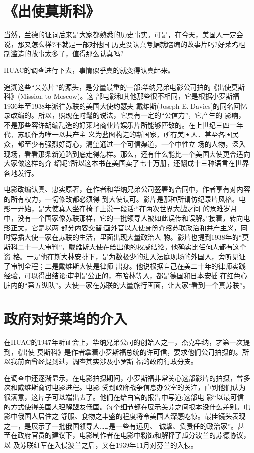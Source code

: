 \documentclass[10pt]{article}
\begin{document}
{\pagebreak
\section{《出使莫斯科》}

当然，兰德的证词后来是大家都熟悉的历史事实。可是，在今天，美国人一定会说，那又怎么样?不就是一部对他国
历史没认真考据就瞎编的故事片吗?好莱坞粗制滥造的故事太多了，值得那么认真吗?

HUAC的调查进行下去，事情似乎真的就变得认真起来。

追溯这些``亲苏片''的源头，是分量最重的一部:华纳兄弟电影公司拍的《出使莫斯科》(Mission to Moscow)。这
部电影和其他那些很不相同，它是根据小罗斯福1936年至1938年派往苏联的美国大使约瑟夫\textperiodcentered
戴维斯(Joseph E. Davies)的同名回忆录改编的。所以，照现在时髦的说法，它具有一定的``公信力''，它产生的
影响，不是那些容许胡编乱造的好莱坞商业片娱乐片所能够匹敌的。在上世纪三四十年代，苏联作为唯一以共产主
义为蓝图构造的新国家，所有美国人、甚至各国民众，都至少有强烈好奇心，渴望通过一个可信渠道，一个中性立
场的人物，深入现场，看看那条新道路到底走得怎样。那么，还有什么能比一个美国大使更合适向大家做这样的介
绍呢?所以这本书在美国卖了七十万册，还翻成十三种语言在世界各地发行。

电影改编认真、忠实原著，在作者和华纳兄弟公司签署的合同中，作者享有对内容的所有权力，一切修改都必须得
到大使认可。影片是那种所谓仿纪录片风格。电影一开始，是大使真人坐在椅子上说一段话:``在两次世界大战之间
的危难岁月中，没有一个国家像苏联那样，它的一批领导人被如此误传和误解。''接着，转向电影正文，它是以两
部分内容交替:画外音以大使身份介绍苏联政治和共产主义，同时穿插大使一家在苏联的生活，里面出现大量政治人
物。影片也提到1938年的``莫斯科二十一人审判''，戴维斯大使在给出他的权威结论，他确实比任何人都有这个资
格。一是他在斯大林安排下，是为数极少的进入法庭现场的外国人，旁听见证了审判全程；二是戴维斯大使是律师
出身。他说根据自己在美二十年的律师实践经验，可以得出结论:审判是公正的，布哈林等人，都是德国和日本安插
在红色心脏内的``第五纵队''。大使一家在苏联的大量旅行画面，让大家``看到一个真苏联''。

\pagebreak
\section{政府对好莱坞的介入}

在HUAC的1947年听证会上，华纳兄弟公司的创始人之一，杰克\textperiodcentered 华纳，才第一次提到，《出使
莫斯科》是作者拿着小罗斯福总统的许可信，要求他们公司拍摄的。所以我前面曾经提到过，调查其实涉及小罗斯
福的政府行政分支。

在调查中还逐渐显示，在电影拍摄期间，小罗斯福非常关心这部影片的拍摄，曾多次和戴维斯商讨电影进程。电影
受到政府战争信息办公室的关注，直到他们认为很满意，这片子可以端出去了。他们在给白宫的报告中写道:这部电
影``以最可信的方式使得美国人理解盟友俄国。每个细节都在展示美苏之间根本没什么差别。电影中俄国人居住之
舒服、食物之丰盛的程度将令美国人深感吃惊。最佳镜头表现之一，是展示了一批俄国领导人……是一些有远见、
诚挚、负责任的政治家''。甚至在政府官员的建议下，电影制作者在电影中粉饰和解释了瓜分波兰的苏德协议，以
及苏联红军在入侵波兰之后，又在1939年11月对芬兰的入侵。

}
\end{document}
